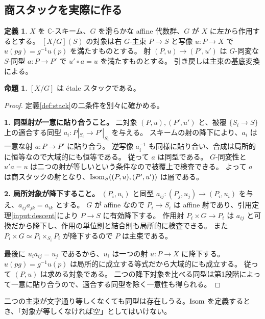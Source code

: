 \documentclass[dvipdfmx,a4paper,11pt]{article}
\theoremstyle{definition}
\newtheorem{prop}[thm]{命題}
\newtheorem{dfn}[thm]{定義}
\newcommand{\C}{\mathbb C}\newcommand{\R}{\mathbb R}\newcommand{\Z}{\mathbb Z}\newcommand{\Q}{\mathbb Q}
\begin{document}
\subsection{商スタックを実際に作る}
\begin{dfn}\label{def:quotstack}
$X$ を $\C$-スキーム、$G$ を滑らかな affine 代数群、$G$ が $X$ に左から作用するとする。
$[X/G](S)$ の対象は右 $G$-主束 $P\to S$ と写像 $u:P\to X$ で
$u(pg)=g^{-1}u(p)$ を満たすものとする。
射 $(P,u)\to(P',u')$ は $G$-同変な $S$-同型 $a:P\to P'$ で $u'\circ a=u$ を満たすものとする。
引き戻しは主束の基底変換による。
\end{dfn}
\begin{prop}\label{prop:quotstack}
$[X/G]$ は étale スタックである。
\end{prop}
\begin{proof}
定義\ref{def:stack}の二条件を別々に確かめる。

\textbf{1. 同型射が一意に貼り合うこと。}
二対象 $(P,u),(P',u')$ と、被覆 $\{S_i\to S\}$ 上の適合する同型 $a_i:P|_{S_i}\to P'|_{S_i}$ を与える。
スキームの射の降下により、$a_i$ は一意な射 $a:P\to P'$ に貼り合う。
逆写像 $a_i^{-1}$ も同様に貼り合い、合成は局所的に恒等なので大域的にも恒等である。
従って $a$ は同型である。
$G$-同変性と $u'a=u$ は二つの射が等しいという条件なので被覆上で検査できる。
よって $a$ は商スタックの射となり、$\operatorname{Isom}_S((P,u),(P',u'))$ は層である。

\textbf{2. 局所対象が降下すること。}
$(P_i,u_i)$ と同型 $a_{ij}:(P_j,u_j)\to(P_i,u_i)$ を与え、$a_{ij}a_{jk}=a_{ik}$ とする。
$G$ が affine なので $P_i\to S_i$ は affine 射であり、引用定理\ref{input:descent}により $P\to S$ に有効降下する。
作用射 $P_i\times G\to P_i$ は $a_{ij}$ と可換だから降下し、作用の単位則と結合則も局所的に検査できる。
また $P_i\times G\simeq P_i\times_{S_i}P_i$ が降下するので $P$ は主束である。

最後に $u_i a_{ij}=u_j$ であるから、$u_i$ は一つの射 $u:P\to X$ に降下する。
$u(pg)=g^{-1}u(p)$ は局所的に成立する等式だから大域的にも成立する。
従って $(P,u)$ は求める対象である。
二つの降下対象を比べる同型は第1段階によって一意に貼り合うので、適合する同型を除く一意性も得られる。
\end{proof}
二つの主束が文字通り等しくなくても同型は存在しうる。$\operatorname{Isom}$ を定義するとき、「対象が等しくなければ空」としてはいけない。
\end{document}
